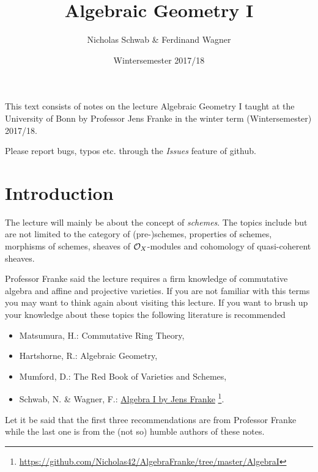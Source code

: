 \documentclass[a4paper,parskip=full,numbers=enddot]{scrreprt}
\title{Algebraic Geometry I}
\author{Nicholas Schwab \& Ferdinand Wagner}
\date{Wintersemester 2017/18}
\begin{document}
\maketitle
{}
 
This text consists of notes on the lecture Algebraic Geometry I taught at the University of Bonn by Professor Jens Franke in the winter term (Wintersemester) 2017/18. 

Please report bugs, typos etc. through the \emph{Issues} feature of github.

\tableofcontents

\chapter*{Introduction}
The lecture will mainly be about the concept of \emph{schemes}. The topics include but are not limited to the category of (pre-)schemes, properties of schemes, morphisms of schemes, sheaves of $\mathcal{O}_X$-modules and cohomology of quasi-coherent sheaves.

Professor Franke said the lecture requires a firm knowledge of commutative algebra and affine and projective varieties. If you are not familiar with this terms you may want to think again about visiting this lecture. If you want to brush up your knowledge about these topics the following literature is recommended
\begin{itemize}
 \item Matsumura, H.: Commutative Ring Theory,
 \item Hartshorne, R.: Algebraic Geometry,
 \item Mumford, D.: The Red Book of Varieties and Schemes,
 \item Schwab, N. \& Wagner, F.: \href{https://github.com/Nicholas42/AlgebraFranke/tree/master/AlgebraI}{Algebra I by Jens Franke} \cite{alg1}\footnote{\url{https://github.com/Nicholas42/AlgebraFranke/tree/master/AlgebraI}}.
\end{itemize}
Let it be said that the first three recommendations are from Professor Franke while the last one is from the (not so) humble authors of these notes.
\end{document}
